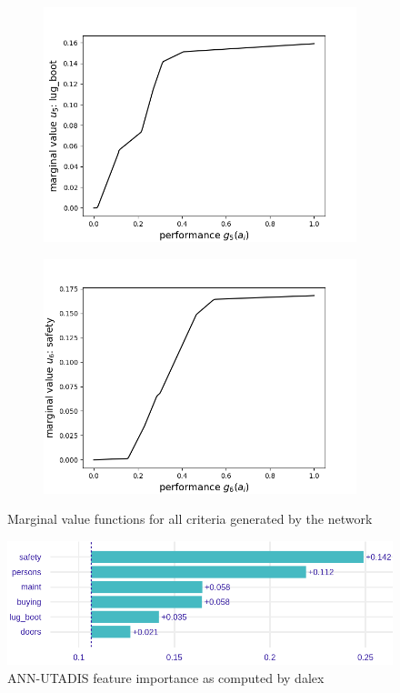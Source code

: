 \documentclass[../main.tex]{subfiles}
\begin{document}
\begin{figure}[H]
    \begin{subfigure}[b]{0.48\linewidth}
        \includegraphics[width=\linewidth]{../img/marginal4.png}
    \end{subfigure}
    \begin{subfigure}[b]{0.48\linewidth}
        \includegraphics[width=\linewidth]{../img/marginal5.png}
    \end{subfigure}
    \caption{Marginal value functions for all criteria generated by the network}
\end{figure}

\begin{figure}[H]
    \centering
    \includegraphics[width=\linewidth]{../img/UTA-feature-importance.png}
    \caption{ANN-UTADIS feature importance as computed by dalex}
    \label{fig:UTA-feats}
\end{figure}
\end{document}
